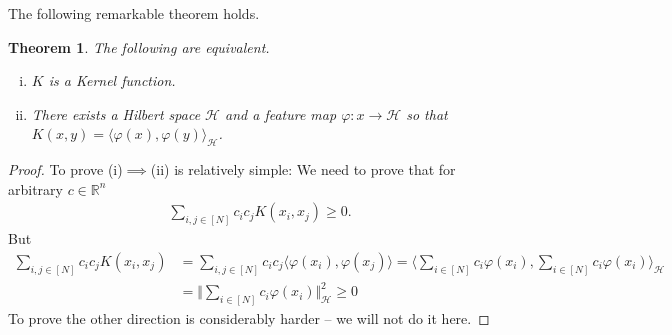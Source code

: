 \documentclass{article}
\newcommand{\calH}{\mathcal{H}}
\newcommand{\sprod}[1]{\langle #1 \rangle}
\newcommand{\R}{\mathbb{R}}
\newtheorem{theorem}{Theorem}
\newcommand{\norm}[1]{\Vert #1 \Vert}
\begin{document}
The following remarkable theorem holds.
\begin{theorem}
    The following are equivalent.
    \begin{enumerate}[(i)]
        \item $K$ is a Kernel function.
        \item There exists a Hilbert space $\calH$ and a feature map $\varphi: x\to \calH$ so that $K(x,y) = \sprod{\varphi(x),\varphi(y)}_{\calH}$.
    \end{enumerate}
\end{theorem}
\begin{proof}
    To prove (i)$\implies$(ii) is relatively simple: We need to prove that for arbitrary $c\in \R^n$
    \begin{align*}
        \sum_{i,j\in [N]} c_ic_j K(x_i,x_j) \geq 0.
    \end{align*}
    But
    \begin{align*}
        \sum_{i,j \in [N]} c_ic_j K(x_i,x_j) &=   \sum_{i,j \in [N]} c_ic_j\sprod{\varphi(x_i),\varphi(x_j)} = \sprod{\sum_{i\in [N]}c_i \varphi(x_i),\sum_{i\in [N]}c_i \varphi(x_i)}_\calH \\
        &= \norm{\sum_{i\in [N]}c_i \varphi(x_i)}_\calH^2\geq 0
    \end{align*}
    To prove the other direction is considerably harder -- we will not do it here.
\end{proof}
\end{document}
